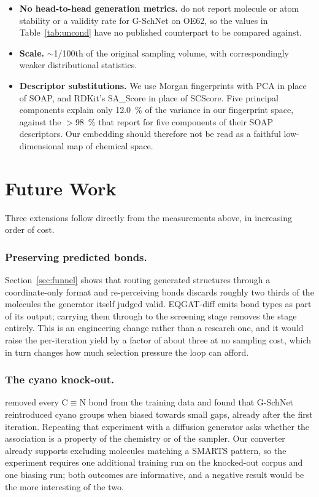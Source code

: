 \documentclass[runningheads]{llncs}
\begin{document}
\begin{itemize}
  \item \textbf{No head-to-head generation metrics.}
        \cite{westermayr2022} do not report molecule or atom stability or
        a validity rate for G-SchNet on OE62, so the values in
        Table~\ref{tab:uncond} have no published counterpart to be
        compared against.
  \item \textbf{Scale.} $\sim$1/100th of the original sampling volume,
        with correspondingly weaker distributional statistics.
  \item \textbf{Descriptor substitutions.} We use Morgan fingerprints
        with PCA in place of SOAP, and RDKit's SA\_Score in place of
        SCScore. Five principal components explain only
        \SI{12.0}{\percent} of the variance in our fingerprint space,
        against the $>$\SI{98}{\percent} that \cite{westermayr2022}
        report for five components of their SOAP descriptors. Our
        embedding should therefore not be read as a faithful
        low-dimensional map of chemical space.
\end{itemize}


\section{Future Work}

Three extensions follow directly from the measurements above, in
increasing order of cost.

\subsubsection{Preserving predicted bonds.}
Section~\ref{sec:funnel} shows that routing generated structures through
a coordinate-only format and re-perceiving bonds discards roughly two
thirds of the molecules the generator itself judged valid. EQGAT-diff
emits bond types as part of its output; carrying them through to the
screening stage removes the stage entirely. This is an engineering
change rather than a research one, and it would raise the per-iteration
yield by a factor of about three at no sampling cost, which in turn
changes how much selection pressure the loop can afford.

\subsubsection{The cyano knock-out.}
\cite{westermayr2022} removed every C$\equiv$N bond from the training
data and found that G-SchNet reintroduced cyano groups when biased
towards small gaps, already after the first iteration. Repeating that
experiment with a diffusion generator asks whether the association is a
property of the chemistry or of the sampler. Our converter already
supports excluding molecules matching a SMARTS pattern, so the
experiment requires one additional training run on the knocked-out
corpus and one biasing run; both outcomes are informative, and a
negative result would be the more interesting of the two.
\end{document}
